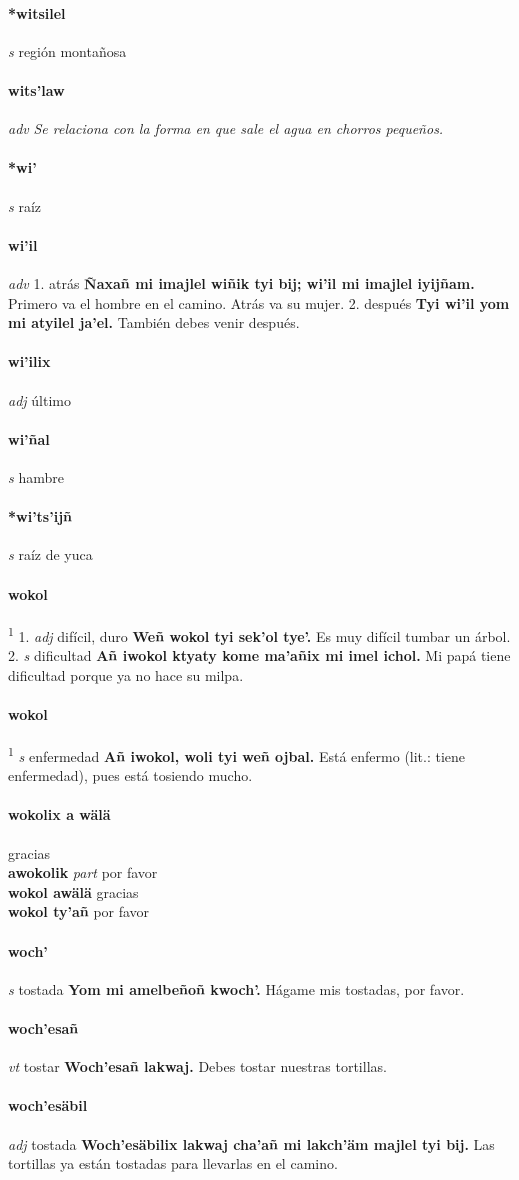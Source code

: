 \documentclass{scrbook}
\newcommand{\entry}[1]{\paragraph{#1}}
\newcommand{\onedefinition}[1]{#1.}
\newcommand{\defsuperscript}[1]{\textsuperscript{1}}
\newcommand{\nontranslationdef}[1]{\textit{#1}}
\newcommand{\partofspeech}[1]{\textit{#1}}
\newcommand{\spanishtranslation}[1]{#1}
\newcommand{\cholexample}[1]{\textbf{#1}}
\newcommand{\exampletranslation}[1]{#1}
\newcommand{\secondaryentry}[1]{\\\textbf{#1}}
\newcommand{\secondpartofspeech}[1]{\textit{#1}}
\newcommand{\secondtranslation}[1]{#1}
\begin{document}
\begin{multicols}{2}
\entry{*witsilel}
\partofspeech{s}
\spanishtranslation{región montañosa}

\entry{wits'law}
\partofspeech{adv}
\nontranslationdef{Se relaciona con la forma en que sale el agua en chorros pequeños.}

\entry{*wi'}
\partofspeech{s}
\spanishtranslation{raíz}

\entry{wi'il}
\partofspeech{adv}
\onedefinition{1}
\spanishtranslation{atrás}
\cholexample{Ñaxañ mi imajlel wiñik tyi bij; wi'il mi imajlel iyijñam.}
\exampletranslation{Primero va el hombre en el camino. Atrás va su mujer.}
\onedefinition{2}
\spanishtranslation{después}
\cholexample{Tyi wi'il yom mi atyilel ja'el.}
\exampletranslation{También debes venir después.}

\entry{wi'ilix}
\partofspeech{adj}
\spanishtranslation{último}

\entry{wi'ñal}
\partofspeech{s}
\spanishtranslation{hambre}

\entry{*wi'ts'ijñ}
\partofspeech{s}
\spanishtranslation{raíz de yuca}

\entry{wokol}
\defsuperscript{1}
\onedefinition{1}
\partofspeech{adj}
\spanishtranslation{difícil, duro}
\cholexample{Weñ wokol tyi sek'ol tye'.}
\exampletranslation{Es muy difícil tumbar un árbol.}
\onedefinition{2}
\partofspeech{s}
\spanishtranslation{dificultad}
\cholexample{Añ iwokol ktyaty kome ma'añix mi imel ichol.}
\exampletranslation{Mi papá tiene dificultad porque ya no hace su milpa.}

\entry{wokol}
\defsuperscript{2}
\partofspeech{s}
\spanishtranslation{enfermedad}
\cholexample{Añ iwokol, woli tyi weñ ojbal.}
\exampletranslation{Está enfermo (lit.: tiene enfermedad), pues está tosiendo mucho.}

\entry{wokolix a wälä}
\spanishtranslation{gracias}
\secondaryentry{awokolik}
\secondpartofspeech{part}
\secondtranslation{por favor}
\secondaryentry{wokol awälä}
\secondtranslation{gracias}
\secondaryentry{wokol ty'añ}
\secondtranslation{por favor}

\entry{woch'}
\partofspeech{s}
\spanishtranslation{tostada}
\cholexample{Yom mi amelbeñoñ kwoch'.}
\exampletranslation{Hágame mis tostadas, por favor.}

\entry{woch'esañ}
\partofspeech{vt}
\spanishtranslation{tostar}
\cholexample{Woch'esañ lakwaj.}
\exampletranslation{Debes tostar nuestras tortillas.}

\entry{woch'esäbil}
\partofspeech{adj}
\spanishtranslation{tostada}
\cholexample{Woch'esäbilix lakwaj cha'añ mi lakch'äm majlel tyi bij.}
\exampletranslation{Las tortillas ya están tostadas para llevarlas en el camino.}


\end{multicols}
\end{document}
